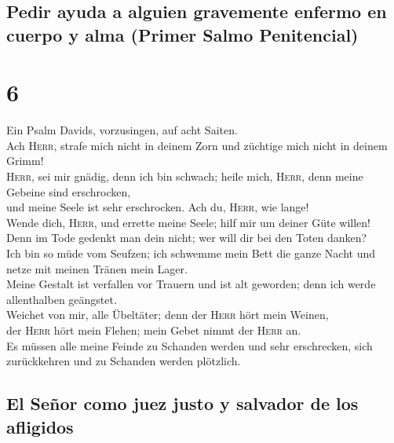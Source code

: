 \hypertarget{pedir-ayuda-a-alguien-gravemente-enfermo-en-cuerpo-y-alma-primer-salmo-penitencial}{%
\subsection{Pedir ayuda a alguien gravemente enfermo en cuerpo y alma
(Primer Salmo
Penitencial)}\label{pedir-ayuda-a-alguien-gravemente-enfermo-en-cuerpo-y-alma-primer-salmo-penitencial}}

\hypertarget{section-5}{%
\section{6}\label{section-5}}

 Ein Psalm Davids, vorzusingen, auf acht Saiten.\\
 Ach \textsc{Herr}, strafe mich nicht in deinem Zorn und
züchtige mich nicht in deinem Grimm!\\
 \textsc{Herr}, sei mir gnädig, denn ich bin schwach;
heile mich, \textsc{Herr}, denn meine Gebeine sind erschrocken,\\
 und meine Seele ist sehr erschrocken. Ach du,
\textsc{Herr}, wie lange!\\
 Wende dich, \textsc{Herr}, und errette meine Seele; hilf
mir um deiner Güte willen!\\
 Denn im Tode gedenkt man dein nicht; wer will dir bei den
Toten danken?\\
 Ich bin so müde vom Seufzen; ich schwemme mein Bett die
ganze Nacht und netze mit meinen Tränen mein Lager.\\
 Meine Gestalt ist verfallen vor Trauern und ist alt
geworden; denn ich werde allenthalben geängstet.\\
 Weichet von mir, alle Übeltäter; denn der \textsc{Herr}
hört mein Weinen,\\
 der \textsc{Herr} hört mein Flehen; mein Gebet nimmt der
\textsc{Herr} an.\\
 Es müssen alle meine Feinde zu Schanden werden und sehr
erschrecken, sich zurückkehren und zu Schanden werden plötzlich.

\hypertarget{el-seuxf1or-como-juez-justo-y-salvador-de-los-afligidos}{%
\subsection{El Señor como juez justo y salvador de los
afligidos}\label{el-seuxf1or-como-juez-justo-y-salvador-de-los-afligidos}}

